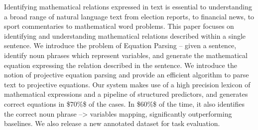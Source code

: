 Identifying mathematical relations expressed in text is essential to understanding a broad range of natural language text from election reports, to financial news, to sport commentaries to mathematical word problems. This paper focuses on identifying and understanding mathematical relations described within a single sentence. We introduce the problem of Equation Parsing -- given a sentence, identify noun phrases which represent variables, and generate the mathematical equation expressing the relation described in the sentence. We introduce the notion of projective equation parsing and provide an efficient algorithm to parse text to projective equations. Our system makes use of a high precision lexicon of mathematical expressions and a pipeline of structured predictors, and generates correct equations in \$70\%\$ of the cases. In \$60\%\$ of the time, it also identifies the correct noun phrase --> variables mapping, significantly outperforming baselines. We also release a new annotated dataset for task evaluation.
